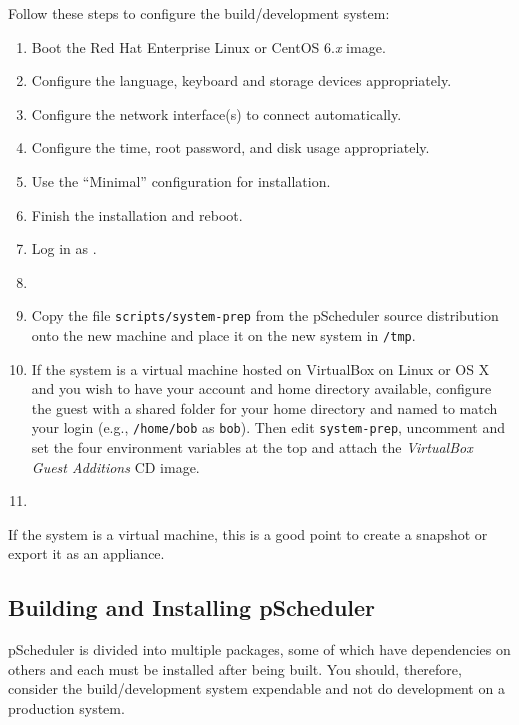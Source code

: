 \documentclass[10pt,titlepage]{article}
\begin{document}
Follow these steps to configure the build/development system:

\begin{enumerate}
\item Boot the Red Hat Enterprise Linux or CentOS 6.{\it x} image.
\item Configure the language, keyboard and storage devices
  appropriately.
\item Configure the network interface(s) to connect automatically.
\item Configure the time, root password, and disk usage appropriately.
\item Use the ``Minimal'' configuration for installation.
\item Finish the installation and reboot.
\item Log in as \root.
\item {}
\item Copy the file {\tt scripts/system-prep} from the pScheduler
  source distribution onto the new machine and place it on the new
  system in {\tt /tmp}.
\item If the system is a virtual machine hosted on VirtualBox on Linux
  or OS X and you wish to have your account and home directory
  available, configure the guest with a shared folder for your home
  directory and named to match your login (e.g., {\tt /home/bob} as
  {\tt bob}).  Then edit {\tt system-prep}, uncomment and set the four
  environment variables at the top and attach the {\it VirtualBox
    Guest Additions} CD image.  
\item {}
\end{enumerate}



If the system is a virtual machine, this is a good point to create a
snapshot or export it as an appliance.


\subsection{Building and Installing pScheduler}

pScheduler is divided into multiple packages, some of which have
dependencies on others and each must be installed after being built.
You should, therefore, consider the build/development system
expendable and not do development on a production system.
\end{document}
